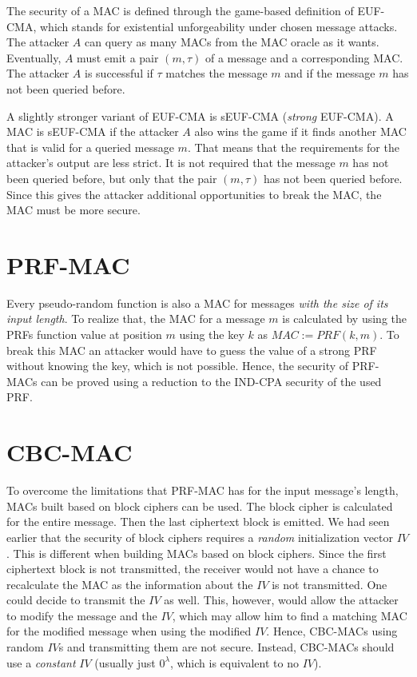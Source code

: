 The security of a \ac{MAC} is defined through the game-based definition of EUF-CMA, which stands for existential unforgeability under chosen message attacks. The attacker $A$ can query as many \acp{MAC} from the \ac{MAC} oracle as it wants. Eventually, $A$ must emit a pair $(m,\tau)$ of a message and a corresponding \ac{MAC}. The attacker $A$ is successful if $\tau$ matches the message $m$ and if the message $m$ has not been queried before.

A slightly stronger variant of EUF-CMA is sEUF-CMA (\emph{strong} EUF-CMA). A \ac{MAC} is sEUF-CMA if the attacker $A$ also wins the game if it finds another \ac{MAC} that is valid for a queried message $m$. That means that the requirements for the attacker's output are less strict. It is not required that the message $m$ has not been queried before, but only that the pair $(m,\tau)$ has not been queried before. Since this gives the attacker additional opportunities to break the \ac{MAC}, the \ac{MAC} must be more secure.

\section{PRF-MAC}

Every pseudo-random function is also a MAC for messages \emph{with the size of its input length}.
To realize that, the MAC for a message $m$ is calculated by using the PRFs function value at position $m$ using the key $k$ as $MAC := PRF(k,m)$.
To break this MAC an attacker would have to guess the value of a strong PRF without knowing the key, which is not possible.
Hence, the security of PRF-MACs can be proved using a reduction to the IND-CPA security of the used PRF.

\section{CBC-MAC}

To overcome the limitations that PRF-MAC has for the input message's length, MACs built based on block ciphers can be used.
The block cipher is calculated for the entire message.
Then the last ciphertext block is emitted.
We had seen earlier that the security of block ciphers requires a \emph{random} initialization vector $IV$.
This is different when building MACs based on block ciphers.
Since the first ciphertext block is not transmitted, the receiver would not have a chance to recalculate the MAC as the information about the $IV$ is not transmitted.
One could decide to transmit the $IV$ as well. This, however, would allow the attacker to modify the message and the $IV$, which may allow him to find a matching MAC for the modified message when using the modified $IV$.
Hence, CBC-MACs using random $IV$s and transmitting them are not secure.
Instead, CBC-MACs should use a \emph{constant} $IV$ (usually just $0^\lambda$, which is equivalent to no $IV$).

